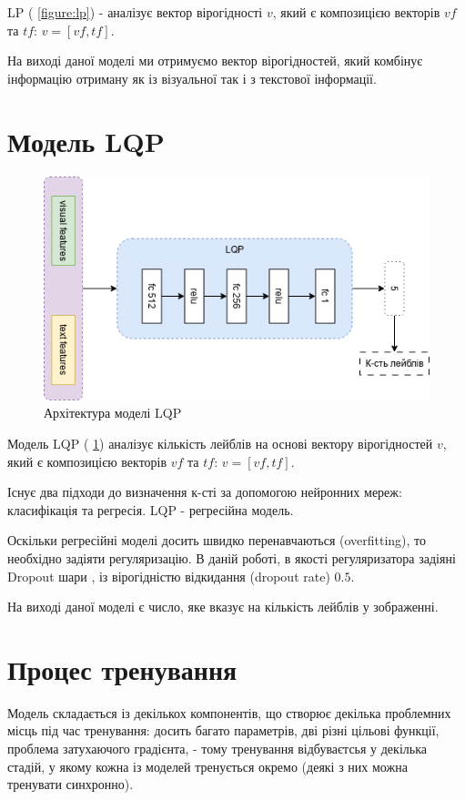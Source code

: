 \documentclass{udstu}
\begin{document}
LP (\figurename{ \ref{figure:lp}}) - аналізує вектор вірогідності $v$,
який є композицією векторів $vf$ та $tf$: $v = [vf, tf]$.

На виході даної моделі ми отримуємо вектор вірогідностей, який комбінує інформацію отриману як із візуальної так і з
текстової інформації.


\section{Модель LQP}

\begin{figure}[!ht]
	\centering
	\includegraphics[width=1.0\textwidth]{PNG/lqp}
	\caption{Архітектура моделі LQP}
	\label{figure:lqp}
\end{figure}

Модель LQP (\figurename{ \ref{figure:lqp}}) аналізує кількість лейблів на основі вектору вірогідностей $v$,
який є композицією векторів $vf$ та $tf$: $v = [vf, tf]$.

Існує два підходи до визначення к-сті за допомогою нейронних мереж: класифікація та регресія.
LQP - регресійна модель.

Оскільки регресійні моделі досить швидко перенавчаються (overfitting), то необхідно задіяти регуляризацію.
В даній роботі, в якості регуляризатора задіяні Dropout шари \cite{dropout}, із вірогідністю відкидання (dropout rate) $0.5$.

На виході даної моделі є число, яке вказує на кількість лейблів у зображенні.


\section{Процес тренування}

Модель складається із декількох компонентів, що створює декілька проблемних місць під час тренування:
досить багато параметрів, дві різні цільові функції, проблема затухаючого градієнта, -
тому тренування відбуваєтсья у декілька стадій, у якому кожна із моделей тренується окремо
(деякі з них можна тренувати синхронно).
\end{document}
